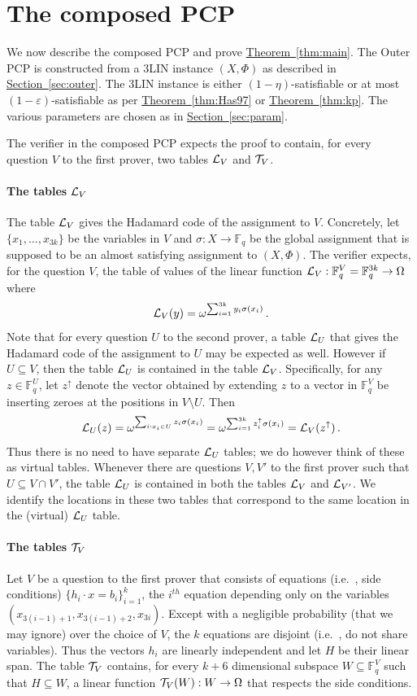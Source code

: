 \documentclass[10pt]{article}
\theoremstyle{definition}
\providecommand{\ie}{i.e.\ }
\numberwithin{equation}{section}
\newcommand{\expref}[2]{\texorpdfstring{\hyperref[#2]{#1~\ref{#2}}}{#1~\ref{#2}}}
\newcommand\calL{{\cal L}}
\newcommand\calT{{\cal T}}
\newcommand\F{\mathbb{F}}
\newcommand{\eps}{\varepsilon}
\renewcommand{\mapsto}{\to}
\begin{document}
\section{The composed PCP}\label{sec:composed}
We now describe the composed PCP and prove \expref{Theorem}{thm:main}.
The Outer PCP is constructed from a 3LIN instance $(X, \Phi)$
as described in \expref{Section}{sec:outer}. The 3LIN instance is either $(1-\eta)$-satisfiable
or at most $(1-\eps)$-satisfiable as per \expref{Theorem}{thm:Has97} or \expref{Theorem}{thm:kp}.
The various parameters are chosen as in \expref{Section}{sec:param}.


The verifier in the composed PCP expects the proof
to contain, for every question $V$ to the first prover, two tables $\calL_V$
and ${\cal T}_V$.

\paragraph{The tables $\calL_V$}
The table $\calL_V$ gives
the Hadamard code of the
assignment to $V$. Concretely, let $\{x_1,\ldots,x_{3k}\}$ be the variables in $V$
and $\sigma : X \mapsto \F_q$ be the global assignment that is supposed to be an
almost satisfying assignment to $(X,\Phi)$. The verifier expects, for the question $V$,
the table of values of the linear function $\calL_V: \F_q^V = \F_q^{3k}
\mapsto \Omega$ where
 $$ \calL_V(y) = \omega^{\sum_{i=1}^{3k} y_i \sigma(x_i)}\,. $$
Note that for every question $U$ to the second prover, a table $\calL_U$ that gives the
Hadamard code
of the assignment to $U$ may be expected as well. However if $U \subseteq V$, then the table $\calL_U$
is contained in the table $\calL_V$. Specifically, for any $z \in \F_q^U$,
let $z^{\uparrow}$ denote the vector obtained by extending $z$
to a vector in $\F_q^V$ be inserting
zeroes at the positions in $V\setminus U$. Then
 $$ \calL_U (z) = \omega^{\sum_{i: x_i \in U} z_i \sigma(x_i)} = \omega^{\sum_{i=1}^{3k}
    z^{\uparrow}_i \sigma(x_i)}
  = \calL_V (z^{\uparrow})\,. $$
Thus there is no need to have separate $\calL_U$ tables; we do however
think of these as virtual tables. Whenever
there are questions $V, V'$ to the first prover such that $U \subseteq V \cap V'$,
the table $\calL_U$ is contained in both the tables $\calL_V$ and $\calL_{V'}$.
We identify the
locations in these two tables that correspond to the same location in the
(virtual) $\calL_U$ table.

\paragraph{The tables $\calT_V$}
Let $V$ be a question to the first prover that consists of equations (\ie,
side conditions)
$\{h_i\cdot x = b_i\}_{i=1}^k$, the $i^{th}$ equation depending only on the
variables $(x_{3(i-1)+1}, x_{3(i-1)+2}, x_{3i})$. Except with a negligible
probability (that we may ignore) over
the choice of $V$, the $k$ equations are disjoint (\ie, do not share variables).
Thus the vectors $h_i$ are
linearly independent and let $H$ be their linear span.
The table $\calT_V$ contains, for every $k+6$ dimensional subspace $W \subseteq
\F_q^V$ such that $H\subseteq W$, a linear function $\calT_V(W) : W \mapsto \Omega$
that respects the side conditions.
\end{document}
